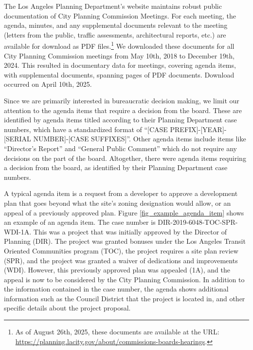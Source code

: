 The Los Angeles Planning Department's website maintains robust public documentation of City Planning Commission Meetings. For each meeting, the agenda, minutes, and any supplemental documents relevant to the meeting (letters from the public, traffic assessments, architectural reports, etc.) are available for download as PDF files.\footnote{As of August 26th, 2025, these documents are available at the URL: \url{https://planning.lacity.gov/about/commissions-boards-hearings}.} We downloaded these documents for all City Planning Commission meetings from May 10th, 2018 to December 19th, 2024. This resulted in documentary data for  meetings, covering  agenda items, with  supplemental documents, spanning  pages of PDF documents. Download occurred on April 10th, 2025.

Since we are primarily interested in bureaucratic decision making, we limit our attention to the agenda items that require a decision from the board. These are identified by agenda items titled according to their Planning Department case numbers, which have a standardized format of ``[CASE PREFIX]-[YEAR]-[SERIAL NUMBER]-[CASE SUFFIXES]''. Other agenda items include items like ``Director's Report'' and ``General Public Comment'' which do not require any decisions on the part of the board. Altogether, there were  agenda items requiring a decision from the board, as identified by their Planning Department case numbers.

A typical agenda item is a request from a developer to approve a development plan that goes beyond what the site's zoning designation would allow, or an appeal of a previously approved plan. Figure \ref{fig_example_agenda_item} shows an example of an agenda item. The case number is DIR-2019-6048-TOC-SPR-WDI-1A. This was a project that was initially approved by the Director of Planning (DIR). The project was granted bonuses under the Los Angeles Transit Oriented Communities program (TOC), the project requires a site plan review (SPR), and the project was granted a waiver of dedications and improvements (WDI). However, this previously approved plan was appealed (1A), and the appeal is now to be considered by the City Planning Commission. In addition to the information contained in the case number, the agenda shows additional information such as the Council District that the project is located in, and other specific details about the project proposal.

